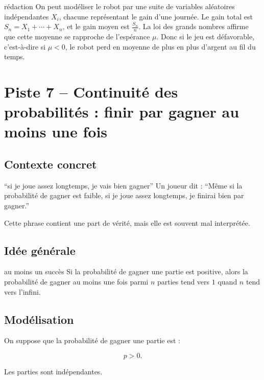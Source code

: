 \documentclass[11pt,a4paper]{article}
\begin{document}
\begin{oral}{rédaction}
On peut modéliser le robot par une suite de variables aléatoires indépendantes $X_i$, chacune représentant le gain d'une journée. Le gain total est $S_n=X_1+\cdots+X_n$, et le gain moyen est $\frac{S_n}{n}$. La loi des grands nombres affirme que cette moyenne se rapproche de l'espérance $\mu$. Donc si le jeu est défavorable, c'est-à-dire si $\mu<0$, le robot perd en moyenne de plus en plus d'argent au fil du temps.
\end{oral}

\section{Piste 7 -- Continuité des probabilités : finir par gagner au moins une fois}

\subsection{Contexte concret}

\begin{contexte}{``si je joue assez longtemps, je vais bien gagner''}
Un joueur dit : ``Même si la probabilité de gagner est faible, si je joue assez longtemps, je finirai bien par gagner.''

Cette phrase contient une part de vérité, mais elle est souvent mal interprétée.
\end{contexte}

\subsection{Idée générale}

\begin{idee}{au moins un succès}
Si la probabilité de gagner une partie est positive, alors la probabilité de gagner au moins une fois parmi $n$ parties tend vers $1$ quand $n$ tend vers l'infini.
\end{idee}

\subsection{Modélisation}

On suppose que la probabilité de gagner une partie est :

\[
p>0.
\]

Les parties sont indépendantes.
\end{document}
